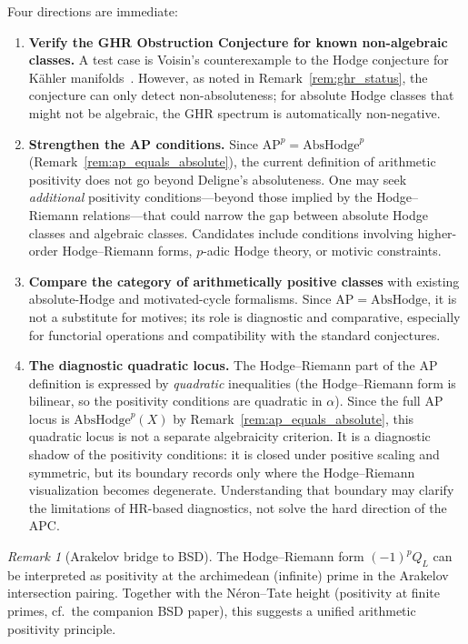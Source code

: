 \documentclass[aps,prd,twocolumn,superscriptaddress,nofootinbib]{revtex4-2}
\theoremstyle{definition}
\theoremstyle{remark}
\newtheorem{remark}[theorem]{Remark}
\begin{document}
Four directions are immediate:

\begin{enumerate}
\item \textbf{Verify the GHR Obstruction Conjecture for known non-algebraic classes.} A test case is Voisin's counterexample to the Hodge conjecture for Kähler manifolds~\cite{Voisin2002b}. However, as noted in Remark~\ref{rem:ghr_status}, the conjecture can only detect non-absoluteness; for absolute Hodge classes that might not be algebraic, the GHR spectrum is automatically non-negative.

\item \textbf{Strengthen the AP conditions.} Since $\mathrm{AP}^p = \mathrm{AbsHodge}^p$ (Remark~\ref{rem:ap_equals_absolute}), the current definition of arithmetic positivity does not go beyond Deligne's absoluteness. One may seek \textit{additional} positivity conditions---beyond those implied by the Hodge--Riemann relations---that could narrow the gap between absolute Hodge classes and algebraic classes. Candidates include conditions involving higher-order Hodge--Riemann forms, $p$-adic Hodge theory, or motivic constraints.

\item \textbf{Compare the category of arithmetically positive classes} with existing absolute-Hodge and motivated-cycle formalisms. Since $\mathrm{AP}=\mathrm{AbsHodge}$, it is not a substitute for motives; its role is diagnostic and comparative, especially for functorial operations and compatibility with the standard conjectures.

\item \textbf{The diagnostic quadratic locus.} The Hodge--Riemann part of the AP definition is expressed by \emph{quadratic} inequalities (the Hodge--Riemann form is bilinear, so the positivity conditions are quadratic in $\alpha$). Since the full AP locus is $\mathrm{AbsHodge}^p(X)$ by Remark~\ref{rem:ap_equals_absolute}, this quadratic locus is not a separate algebraicity criterion. It is a diagnostic shadow of the positivity conditions: it is closed under positive scaling and symmetric, but its boundary records only where the Hodge--Riemann visualization becomes degenerate. Understanding that boundary may clarify the limitations of HR-based diagnostics, not solve the hard direction of the APC.
\end{enumerate}


\begin{remark}[Arakelov bridge to BSD]
\label{rem:arakelov-bridge}
The Hodge--Riemann form $(-1)^p Q_L$ can be interpreted as positivity at the archimedean (infinite) prime in the Arakelov intersection pairing. Together with the Néron--Tate height (positivity at finite primes, cf.\ the companion BSD paper), this suggests a unified arithmetic positivity principle.
\end{remark}
\end{document}
